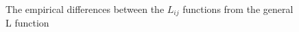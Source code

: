\documentclass[12pt,a4paper,oneside,article]{memoir}
\begin{document}
\begin{figure}[htbp]
  \begin{adjustwidth}{-2in}{-2in}
	  \centering
  \end{adjustwidth}
  \caption{The empirical differences between the $L_{ij}$ functions from the general L function}
  \label{fig:csri}
\end{figure}
\end{document}
